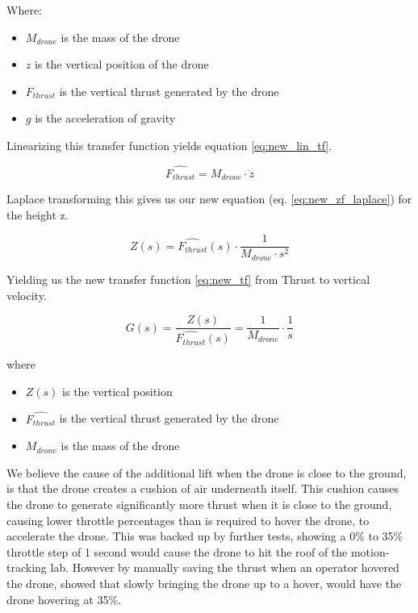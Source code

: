 Where:
\begin{itemize}
    \item $M_{drone}$ is the mass of the drone
    \item $z$ is the vertical position of the drone
    \item $F_{thrust}$ is the vertical thrust generated by the drone
    \item $g$ is the acceleration of gravity
\end{itemize}

Linearizing this transfer function yields equation \ref{eq:new_lin_tf}.

\begin{equation} \label{eq:new_lin_tf}
    \hat{F_{thrust}} = M_{drone} \cdot \ddot{z}
\end{equation}

Laplace transforming this gives us our new equation (eq. \ref{eq:new_zf_laplace}) for the height z.

\begin{equation} \label{eq:new_zf_laplace}
    Z(s) = \hat{F_{thrust}}(s) \cdot \frac{1}{M_{drone} \cdot s^2}
\end{equation}

Yielding us the new transfer function \ref{eq:new_tf} from Thrust to vertical velocity.

\begin{equation} \label{eq:new_tf}
    G(s) = \frac{Z(s)}{\hat{F_{thrust}}(s)} = \frac{1}{M_{drone}} \cdot \frac{1}{s}
\end{equation}

where
\begin{itemize}
    \item $Z(s)$ is the vertical position
    \item $\hat{F_{thrust}}$ is the vertical thrust generated by the drone
    \item $M_{drone}$ is the mass of the drone
\end{itemize}

We believe the cause of the additional lift when the drone is close to the ground, is that the drone creates a cushion of air underneath itself. This cushion causes the drone to generate significantly more thrust when it is close to the ground, causing lower throttle percentages than is required to hover the drone, to accelerate the drone. This was backed up by further tests, showing a 0\% to 35\% throttle step of 1 second would cause the drone to hit the roof of the motion-tracking lab. However by manually saving the thrust when an operator hovered the drone, showed that slowly bringing the drone up to a hover, would have the drone hovering at 35\%.

